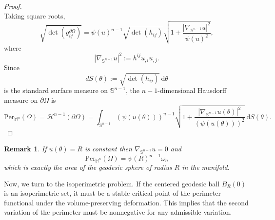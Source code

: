 \documentclass[a4paper,11pt,reqno]{amsart}
\theoremstyle{plain}
\newtheorem{remark}{Remark}[section]
\numberwithin{equation}{section} \allowdisplaybreaks
\newcommand{\m}{\mathbb{M}^n}
\newcommand{\sn}{\mathbb{S}^{n-1}}
\newcommand{\uv}{\omega_n}
\begin{document}
\begin{proof}
\begin{equation*}
\end{equation*}
Taking square roots,
\begin{equation*}
    \sqrt{\det(g_{ij}^{\partial \Omega})}= \psi(u)^{n-1}\sqrt{\det(h_{ij})}\sqrt{1+\frac{|\nabla_{\sn}u|^2}{\psi(u)^2}},
\end{equation*}
where
\begin{equation*}
    |\nabla_{\sn}u|^2:= h^{ij}u_{,i}u_{,j}.
\end{equation*}
Since 
\begin{equation*}
    dS(\theta):=\sqrt{\det(h_{ij})}\ \mathrm{d}\theta
\end{equation*}
is the standard surface measure on $\sn$, the $n-1$-dimensional Hausdorff measure on $\partial \Omega$ is
\begin{equation*}
    \text{Per}_{\m}(\Omega)=\mathcal{H}^{n-1}(\partial \Omega)= \int_{\sn}(\psi(u(\theta)))^{n-1}\sqrt{1+\frac{|\nabla_{\sn}u(\theta)|^2}{(\psi(u(\theta)))^2}}\ \mathrm{d}S(\theta).
\end{equation*}
\end{proof}
\begin{remark}
\rm
    If $u(\theta)=R$ is constant then $\nabla_{\sn}u=0$ and 
    \begin{equation*}
        \text{Per}_{\m}(\Omega)=\psi(R)^{n-1}\uv
    \end{equation*}
    which is exactly the area of the geodesic sphere of radius $R$ in the manifold.\rm
\end{remark}

Now, we turn to the isoperimetric problem. If the centered geodesic ball $B_R(0)$ is an isoperimetric set, it must be a stable critical point of the perimeter functional under the volume-preserving deformation. This implies that the second variation of the perimeter must be nonnegative for any admissible variation.
\end{document}
